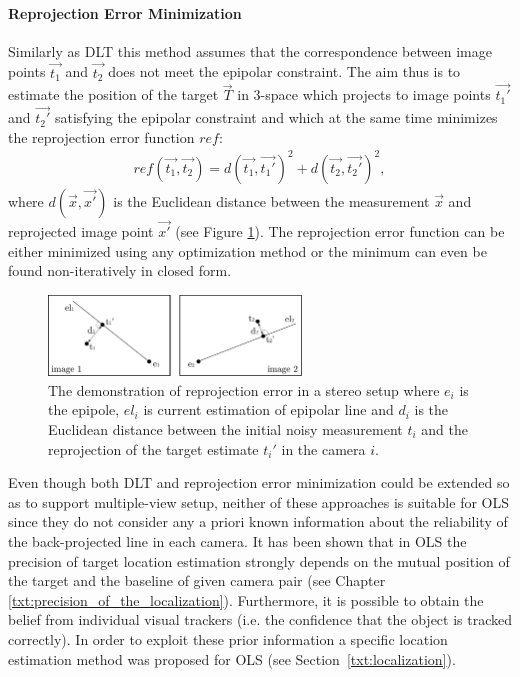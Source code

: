 \paragraph{Reprojection Error Minimization} Similarly as DLT this method assumes that the correspondence between image points $\vec{t_{1}}$ and $\vec{t_{2}}$ does not meet the epipolar constraint. The aim thus is to estimate the position of the target $\vec{T}$ in 3-space which projects to image points $\vec{t_{1}'}$ and $\vec{t_{2}'}$ satisfying the epipolar constraint and which at the same time minimizes the reprojection error function $ref$:
\begin{align}
	ref(\vec{t_{1}}, \vec{t_{2}}) = d(\vec{t_{1}}, \vec{t_{1}'})^{2} + d(\vec{t_{2}}, \vec{t_{2}'})^{2},
\end{align}
where $d(\vec{x}, \vec{x'})$ is the Euclidean distance between the measurement $\vec{x}$ and reprojected image point $\vec{x'}$ (see Figure \ref{fig:reprojection}). The reprojection error function can be either minimized using any optimization method or the minimum can even be found non-iteratively in closed form.

\begin{figure}[tbh]
	\centering
	\includegraphics[width=0.6\textwidth]{fig/reprojection.pdf}
	\caption{The demonstration of reprojection error in a stereo setup where $e_{i}$ is the epipole, $el_{i}$ is current estimation of epipolar line and $d_{i}$ is the Euclidean distance between the initial noisy measurement $t_{i}$ and the reprojection of the target estimate $t_{i}'$ in the camera $i$.}
	\label{fig:reprojection}
\end{figure}

Even though both DLT and reprojection error minimization could be extended so as to support multiple-view setup, neither of these approaches is suitable for OLS since they do not consider any a priori known information about the reliability of the back-projected line in each camera. It has been shown that in OLS the precision of target location estimation strongly depends on the mutual position of the target and the baseline of given camera pair (see Chapter \ref{txt:precision_of_the_localization}). Furthermore, it is possible to obtain the belief from individual visual trackers (i.e. the confidence that the object is tracked correctly). In order to exploit these prior information a specific location estimation method was proposed for OLS (see Section~\ref{txt:localization}).

